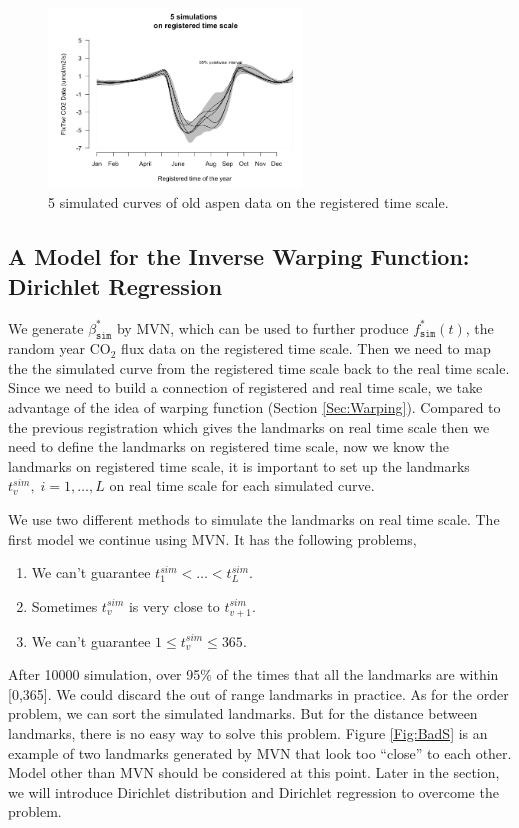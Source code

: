 \documentclass{article}
\begin{document}
\begin{figure}[!ht]
\centering
\includegraphics[width=0.6\textwidth]{regiSimi1.png}
\caption{5 simulated curves of old aspen data on the registered time scale.}\label{Fig:regiSimi}
\end{figure}

\subsection{A Model for the Inverse Warping Function: Dirichlet Regression}\label{Sec:DiriReg}

We generate $\beta^*_{\texttt{sim}}$ by MVN, which can be used to further produce $f^*_{\texttt{sim}}(t)$, the random year CO$_2$ flux data on the registered time scale. Then we need to map the the simulated curve from the registered time scale back to the real time scale.  Since we need to build a connection of registered and real time scale, we take advantage of the idea of warping function (Section \ref{Sec:Warping}).  
Compared to the previous registration which gives the landmarks on real time scale then we need to define the landmarks on registered time scale, now we know the landmarks on registered time scale, it is important to set up the landmarks  $t_{v}^{sim},\;i=1,\dots,L$ on real time scale for each simulated curve. 

We use two different methods to simulate the landmarks on real time scale. 
The first model we continue using MVN.  It has the following problems,

\begin{enumerate}
\item We can't guarantee $t_1^{sim}<\dots<t_L^{sim}$.
\item Sometimes $t_{v}^{sim}$ is very close to $t_{v+1}^{sim}$.
\item We can't guarantee $1\le t_{v}^{sim}\le 365$.
\end{enumerate}

After 10000 simulation, over 95\% of the times that all the landmarks are within [0,365].
We could discard the out of range landmarks in practice.
As for the order problem, we can sort the simulated landmarks. But for the distance between landmarks, there is no easy way to solve this problem. 
Figure \ref{Fig:BadS} is an example of two landmarks generated by MVN that look too ``close'' to each other. Model other than MVN should be considered at this point.  Later in the section, we will introduce Dirichlet distribution and Dirichlet regression to overcome the problem.
\end{document}
